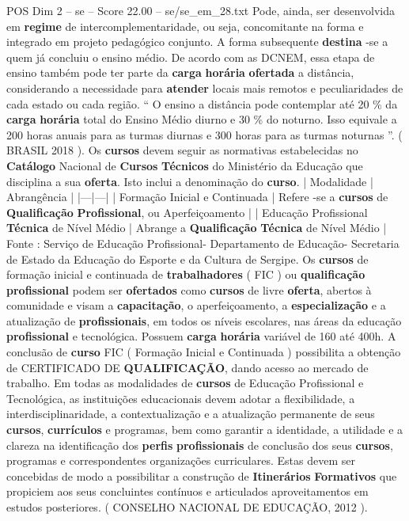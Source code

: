 \begin{textsample}{POS Dim 2 – se – Score 22.00 – se/se\_em\_28.txt}
Pode, ainda, ser desenvolvida em \textbf{regime} de intercomplementaridade, ou seja, concomitante na forma e integrado em projeto pedagógico conjunto.
A forma subsequente \textbf{destina} -se a quem já concluiu o ensino médio.
De acordo com as DCNEM, essa etapa de ensino também pode ter parte da \textbf{carga} \textbf{horária} \textbf{ofertada} a distância, considerando a necessidade para \textbf{atender} locais mais remotos e peculiaridades de cada estado ou cada região. “ O ensino a distância pode contemplar até 20 \% da \textbf{carga} \textbf{horária} total do Ensino Médio diurno e 30 \% do noturno.
Isso equivale a 200 horas anuais para as turmas diurnas e 300 horas para as turmas noturnas ”. ( BRASIL 2018 ).
Os \textbf{cursos} devem seguir as normativas estabelecidas no \textbf{Catálogo} Nacional de \textbf{Cursos} \textbf{Técnicos} do Ministério da Educação que disciplina a sua \textbf{oferta}.
Isto inclui a denominação do \textbf{curso}. | Modalidade | Abrangência | |---|---| | Formação Inicial e Continuada | Refere -se a \textbf{cursos} de \textbf{Qualificação} \textbf{Profissional}, ou Aperfeiçoamento | | Educação Profissional \textbf{Técnica} de Nível Médio | Abrange a \textbf{Qualificação} \textbf{Técnica} de Nível Médio | Fonte : Serviço de Educação Profissional- Departamento de Educação- Secretaria de Estado da Educação do Esporte e da Cultura de Sergipe.
Os \textbf{cursos} de formação inicial e continuada de \textbf{trabalhadores} ( FIC ) ou \textbf{qualificação} \textbf{profissional} podem ser \textbf{ofertados} como \textbf{cursos} de livre \textbf{oferta}, abertos à comunidade e visam a \textbf{capacitação}, o aperfeiçoamento, a \textbf{especialização} e a atualização de \textbf{profissionais}, em todos os níveis escolares, nas áreas da educação \textbf{profissional} e tecnológica.
Possuem \textbf{carga} \textbf{horária} variável de 160 até 400h.
A conclusão de \textbf{curso} FIC ( Formação Inicial e Continuada ) possibilita a obtenção de CERTIFICADO DE \textbf{QUALIFICAÇÃO}, dando acesso ao mercado de trabalho.
Em todas as modalidades de \textbf{cursos} de Educação Profissional e Tecnológica, as instituições educacionais devem adotar a flexibilidade, a interdisciplinaridade, a contextualização e a atualização permanente de seus \textbf{cursos}, \textbf{currículos} e programas, bem como garantir a identidade, a utilidade e a clareza na identificação dos \textbf{perfis} \textbf{profissionais} de conclusão dos seus \textbf{cursos}, programas e correspondentes organizações curriculares.
Estas devem ser concebidas de modo a possibilitar a construção de \textbf{Itinerários} \textbf{Formativos} que propiciem aos seus concluintes contínuos e articulados aproveitamentos em estudos posteriores. ( CONSELHO NACIONAL DE EDUCAÇÃO, 2012 ).

\end{textsample}
